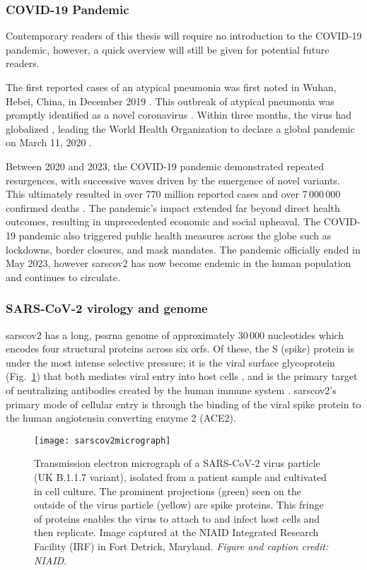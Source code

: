 \subsubsection{COVID-19 Pandemic}
Contemporary readers of this thesis will require no introduction to the COVID-19 pandemic, however, a quick overview will still be given for potential future readers.

The first reported cases of an atypical pneumonia was first noted in Wuhan, Hebei, China, in December 2019 \citep{zhou2020pneumonia}.
This outbreak of atypical pneumonia was promptly identified as a novel coronavirus \citep{wu2020new}.
Within three months, the virus had globalized \cite{dong2020interactive}, leading the World Health Organization to declare a global pandemic on March 11, 2020 \cite{healthorganization2020coronavirus}.

Between 2020 and 2023, the COVID-19 pandemic demonstrated repeated resurgences, with successive waves driven by the emergence of novel variants.
This ultimately resulted in over 770 million reported cases and over 7\,000\,000 confirmed deaths \citep{ourworldindata-covid-explorer}.
The pandemic's impact extended far beyond direct health outcomes, resulting in unprecedented economic and social upheaval.
The COVID-19 pandemic also triggered public health measures across the globe such as lockdowns, border closures, and mask mandates.
The pandemic officially ended in May 2023, however \gls{sarscov2} has now become endemic in the human population and continues to circulate.

\subsubsection{SARS-CoV-2 virology and genome}
\gls{sarscov2} has a long, \gls{pssrna} genome of approximately 30\,000 nucleotides which encodes four structural proteins across six \gls{orf}s.
Of these, the S (spike) protein is under the most intense selective pressure; it is the viral surface glycoprotein (Fig.~\ref{fig:sarscov2micrograph}) that both mediates viral entry into host cells \citep{zhu2021molecular}, and is the primary target of neutralizing antibodies created by the human immune system \citep{v2021coronavirus}.
\gls{sarscov2}'s primary mode of cellular entry is through the binding of the viral spike protein to the human angiotensin converting enzyme 2 (ACE2).

\begin{figure}[ht]
  \centering
  \texttt{[image: sarscov2micrograph]}
  \caption[SARS-CoV-2 electron micrograph]{Transmission electron micrograph of a SARS-CoV-2 virus particle (UK B.1.1.7 variant), isolated from a patient sample and cultivated in cell culture. The prominent projections (green) seen on the outside of the virus particle (yellow) are spike proteins. This fringe of proteins enables the virus to attach to and infect host cells and then replicate. Image captured at the NIAID Integrated Research Facility (IRF) in Fort Detrick, Maryland.
  \textit{Figure and caption credit: NIAID}.
  }
  \label{fig:sarscov2micrograph}
\end{figure}

